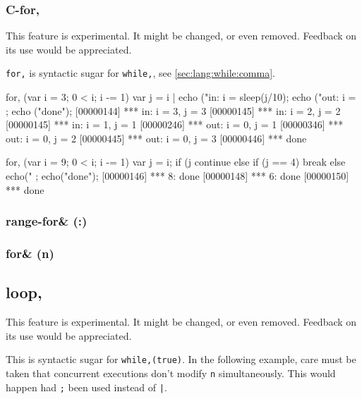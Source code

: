 \subsubsection{C-for,}
\begin{note}
  This feature is experimental.  It might be changed, or even removed.
  Feedback on its use would be appreciated.
\end{note}

\lstinline|for,| is syntactic sugar for \lstinline|while,|, see
\autoref{sec:lang:while:comma}.

\begin{urbiscript}[firstnumber=last]
for, (var i = 3; 0 < i; i -= 1)
{
  var j = i |
  echo ("in: i = %
  sleep(j/10);
  echo ("out: i = %
};
echo ("done");
[00000144] *** in: i = 3, j = 3
[00000145] *** in: i = 2, j = 2
[00000145] *** in: i = 1, j = 1
[00000246] *** out: i = 0, j = 1
[00000346] *** out: i = 0, j = 2
[00000445] *** out: i = 0, j = 3
[00000446] *** done
\end{urbiscript}

\begin{urbiscript}[firstnumber=last]
for, (var i = 9; 0 < i; i -= 1)
{
  var j = i;
  if (j %
    continue
  else if (j == 4)
    break
  else
    echo("%
};
echo("done");
[00000146] *** 8: done
[00000148] *** 6: done
[00000150] *** done
\end{urbiscript}


\subsubsection{range-for\& (:)}
\subsubsection{for\& (n)}

\subsection{loop,}
\begin{note}
  This feature is experimental.  It might be changed, or even removed.
  Feedback on its use would be appreciated.
\end{note}

This is syntactic sugar for \lstinline|while,(true)|.  In the
following example, care must be taken that concurrent executions don't
modify \lstinline|n| simultaneously.  This would happen had
\lstinline|;| been used instead of \lstinline'|'.

